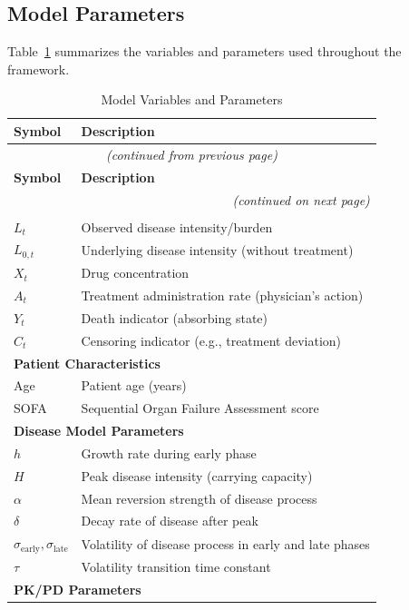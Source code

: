 \subsection{Model Parameters}
Table~\ref{tab:model_vars} summarizes the variables and parameters used throughout the framework. 

\begin{longtable}{lp{10cm}}
\caption{Model Variables and Parameters} \label{tab:model_vars} \\
\toprule
\textbf{Symbol} & \textbf{Description} \\
\midrule
\endfirsthead
\multicolumn{2}{c}{\textit{(continued from previous page)}} \\
\toprule
\textbf{Symbol} & \textbf{Description} \\
\midrule
\endhead
\midrule
\multicolumn{2}{r}{\textit{(continued on next page)}} \\
\endfoot
\bottomrule
\endlastfoot
\multicolumn{2}{l}{\textbf{State Variables}} \\
$L_t$ & Observed disease intensity/burden \\
$L_{0,t}$ & Underlying disease intensity (without treatment) \\
$X_t$ & Drug concentration \\
$A_t$ & Treatment administration rate (physician's action) \\
$Y_t$ & Death indicator (absorbing state) \\
$C_t$ & Censoring indicator (e.g., treatment deviation) \\
\midrule
\multicolumn{2}{l}{\textbf{Patient Characteristics}} \\
Age & Patient age (years) \\
SOFA & Sequential Organ Failure Assessment score \\
\midrule
\multicolumn{2}{l}{\textbf{Disease Model Parameters}} \\
$h$ & Growth rate during early phase \\
$H$ & Peak disease intensity (carrying capacity) \\
$\alpha$ & Mean reversion strength of disease process \\
$\delta$ & Decay rate of disease after peak \\
$\sigma_{\text{early}}, \sigma_{\text{late}}$ & Volatility of disease process in early and late phases \\
$\tau$ & Volatility transition time constant \\
\midrule
\multicolumn{2}{l}{\textbf{PK/PD Parameters}} \\

\end{longtable}
